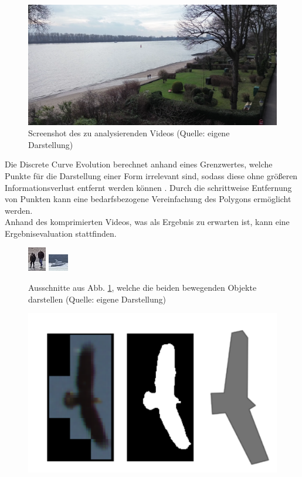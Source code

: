 \documentclass[a4paper,11pt,pdftex, parskip]{scrreprt}
\begin{document}
{\begin{figure}[ht]
    \centering
    \includegraphics[scale=0.2, keepaspectratio]{images/screenshot_video_moratz.png}
    \caption[Screenshot des zu analysierenden Videos]{Screenshot des zu analysierenden Videos (Quelle: eigene Darstellung)}
    \label{Scr_ges_Vid}
\end{figure}
Die Discrete Curve Evolution berechnet anhand eines Grenzwertes, welche Punkte für die Darstellung einer Form irrelevant sind, sodass diese ohne größeren Informationsverlust entfernt werden können \citep{Barkowsky2000}. Durch die schrittweise Entfernung von Punkten kann eine bedarfsbezogene Vereinfachung des Polygons ermöglicht werden. \\
Anhand des komprimierten Videos, was als Ergebnis zu erwarten ist, kann eine Ergebnisevaluation stattfinden.
\begin{figure}[ht]
    \centering
    \includegraphics[scale = 4, keepaspectratio] {images/detail_screenshot_people.png}
    \includegraphics[scale = 4, keepaspectratio]{images/detail_screenshot_boat.png}
    \caption[Ausschnitte aus Abb. \ref{Scr_ges_Vid}, welche die beiden bewegenden Objekte darstellen ]{Ausschnitte aus Abb. \ref{Scr_ges_Vid}, welche die beiden bewegenden Objekte darstellen (Quelle: eigene Darstellung)}
    \label{Scr_detail_Obj}
\end{figure}
\begin{figure}[ht]
    \centering
    \includegraphics*[scale = 0.5, keepaspectratio]{images/Example_bird.png}

\end{figure}}
\end{document}
